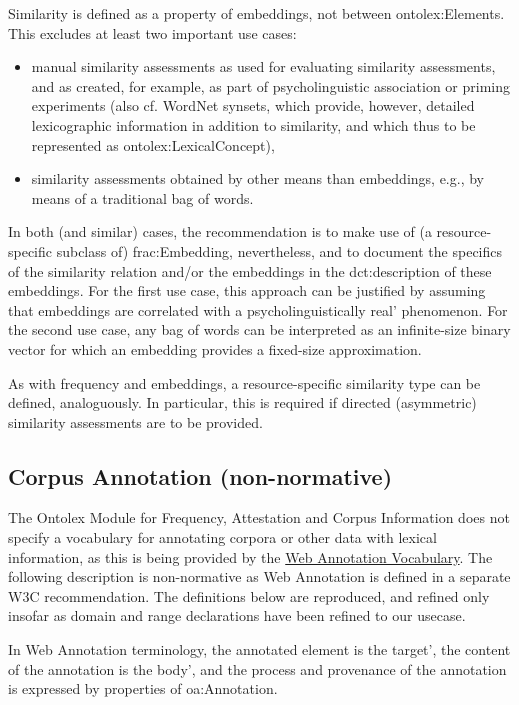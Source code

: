 \documentclass[a4paper]{article}
\newcommand\textstyleInternetlink[1]{\textcolor[rgb]{0.0,0.0,0.5019608}{#1}}
\newcommand\textstyleTeletype[1]{\textrm{#1}}
\newcommand\liststyleWWNumviii{%
\renewcommand\labelitemi{[F0B7?]}
\renewcommand\labelitemii{[F0B7?]}
\renewcommand\labelitemiii{[F0B7?]}
\renewcommand\labelitemiv{[F0B7?]}
}
\begin{document}
\textstyleTeletype{Similarity} is defined as a property of embeddings, not between \textstyleTeletype{ontolex:Element}s. This excludes at least two important use cases: 

\liststyleWWNumviii
\begin{itemize}
\item manual similarity assessments as used for evaluating similarity assessments, and as created, for example, as part of psycholinguistic association or priming experiments (also cf. WordNet synsets, which provide, however, detailed lexicographic information in addition to similarity, and which thus to be represented as \textstyleTeletype{ontolex:LexicalConcept}), 
\item similarity assessments obtained by other means than embeddings, e.g., by means of a traditional bag of words. 
\end{itemize}
In both (and similar) cases, the recommendation is to make use of (a resource-specific subclass of) \textstyleTeletype{frac:Embedding}, nevertheless, and to document the specifics of the similarity relation and/or the embeddings in the \textstyleTeletype{dct:description} of these embeddings. For the first use case, this approach can be justified by assuming that embeddings are correlated with a psycholinguistically {\textasciigrave}real' phenomenon. For the second use case, any bag of words can be interpreted as an infinite-size binary vector for which an embedding provides a fixed-size approximation. 

As with frequency and embeddings, a resource-specific similarity type can be defined, analoguously. In particular, this is required if directed (asymmetric) similarity assessments are to be provided. 

\subsection{Corpus Annotation (non-normative)}
The Ontolex Module for Frequency, Attestation and Corpus Information does not specify a vocabulary for annotating corpora or other data with lexical information, as this is being provided by the \href{https://www.w3.org/TR/annotation-vocab/}{\textstyleInternetlink{Web Annotation Vocabulary}}. The following description is non-normative as Web Annotation is defined in a separate W3C recommendation. The definitions below are reproduced, and refined only insofar as domain and range declarations have been refined to our usecase.

In Web Annotation terminology, the annotated element is the {\textasciigrave}target', the content of the annotation is the {\textasciigrave}body', and the process and provenance of the annotation is expressed by properties of \textstyleTeletype{oa:Annotation}.
\end{document}
